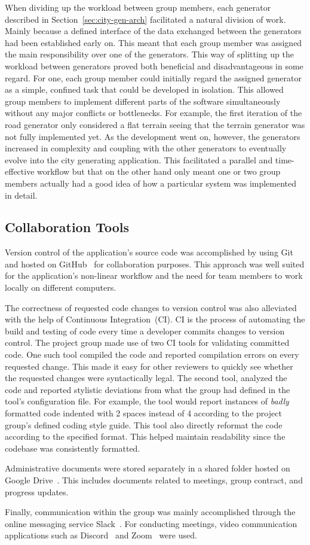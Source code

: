 When dividing up the workload between group members, each generator described in Section~\ref{sec:city-gen-arch} facilitated a natural division of work.
Mainly because a defined interface of the data exchanged between the generators had been established early on.
This meant that each group member was assigned the main responsibility over one of the generators. This way of splitting up the workload between generators proved both beneficial and disadvantageous in some regard.
For one, each group member could initially regard the assigned generator as a simple, confined task that could be developed in isolation.
This allowed group members to implement different parts of the software simultaneously without any major conflicts or bottlenecks.
For example, the first iteration of the road generator only considered a flat terrain seeing that the terrain generator was not fully implemented yet.
As the development went on, however, the generators increased in complexity and coupling with the other generators to eventually evolve into the city generating application.
This facilitated a parallel and time-effective workflow but that on the other hand only meant one or two group members actually had a good idea of how a particular system was implemented in detail.

\subsection{Collaboration Tools}
Version control of the application's source code was accomplished by using Git~\cite{git} and hosted on GitHub~\cite{github} for collaboration purposes.
This approach was well suited for the application's non-linear workflow and the need for team members to work locally on different computers.

The correctness of requested code changes to version control was also alleviated with the help of Continuous Integration~(CI). 
CI is the process of automating the build and testing of code every time a developer commits changes to version control.
The project group made use of two CI tools for validating committed code.
One such tool compiled the code and reported compilation errors on every requested change.
This made it easy for other reviewers to quickly see whether the requested changes were syntactically legal.
The second tool, analyzed the code and reported stylistic deviations from what the group had defined in the tool's configuration file.
For example, the tool would report instances of \textit{badly} formatted code indented with 2 spaces instead of 4 according to the project group's defined coding style guide.
This tool also directly reformat the code according to the specified format.
This helped maintain readability since the codebase was consistently formatted.

Administrative documents were stored separately in a shared folder hosted on Google Drive~\cite{google_drive}.
This includes documents related to meetings, group contract, and progress updates.

Finally, communication within the group was mainly accomplished through the online messaging service Slack~\cite{slack}.
For conducting meetings, video communication applications such as Discord~\cite{discord} and Zoom~\cite{zoom} were used. 

